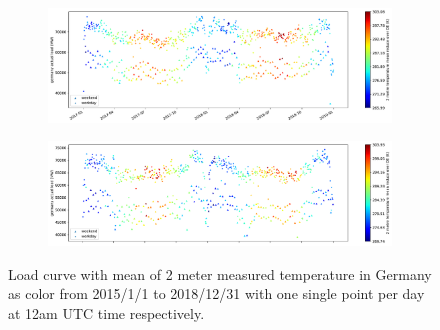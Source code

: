 
\begin{figure}[h!]%
	\centering
	\begin{subfigure}{.5\textwidth}
		\centering
		\includegraphics[width=2.9\textwidth,angle=-90,origin=c]{plots/plot_load_time_func/t2m_mean_18A5_2017010112_2018123112_24F}%
		\label{fig:t2m_mean_18A5_2017010112_2018123112_24F}%
	\end{subfigure}%
	\begin{subfigure}{.5\textwidth}
		\centering
		\includegraphics[width=2.9\textwidth,angle=-90,origin=c]{plots/plot_load_time_func/t2m_mean_18A5_2015010112_2016123112_24F}%
		\label{fig:t2m_mean_18A5_2015010112_2016123112_24F}%
	\end{subfigure}
	\caption{Load curve with mean of 2 meter measured temperature in Germany as color from 2015/1/1 to 2018/12/31 with one single point per day at 12am UTC time respectively.}
	\label{fig:t2m_mean_18A5_twofold_24F}
\end{figure}





